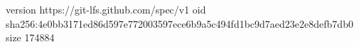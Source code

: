 version https://git-lfs.github.com/spec/v1
oid sha256:4e0bb3171ed86d597e772003597ece6b9a5c494fd1bc9d7aed23e2e8defb7db0
size 174884
